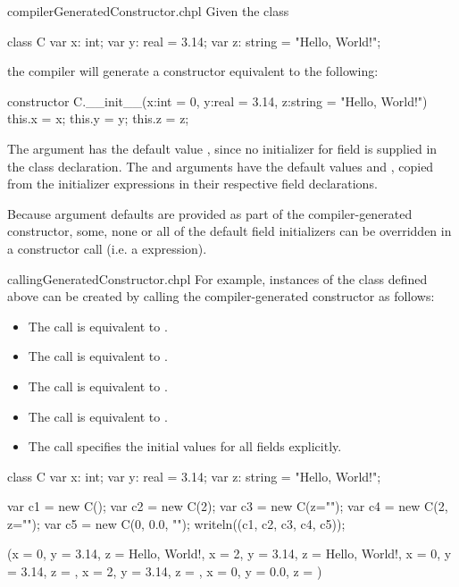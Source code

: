 \begin{chapelexample}{compilerGeneratedConstructor.chpl}
Given the class
\begin{chapel}
class C {
  var x: int;
  var y: real = 3.14;
  var z: string = "Hello, World!";
}
\end{chapel}
the compiler will generate a constructor equivalent to the following:
\begin{chapel}
constructor C.__init__(x:int = 0, y:real = 3.14, z:string = "Hello, World!")
{ this.x = x; this.y = y; this.z = z; }
{}
\end{chapel}
The  argument has the default value , since no initializer for
field  is supplied in the class declaration. The  and 
arguments have the default values  and ,
copied from the initializer expressions in their respective field declarations.
\end{chapelexample}

Because argument defaults are provided as part of the compiler-generated
constructor, some, none or all of the default field initializers can be
overridden in a constructor call (i.e. a  expression).

\begin{chapelexample}{callingGeneratedConstructor.chpl}
For example, instances of the class  defined above can be created by calling the compiler-generated constructor as follows:
\begin{itemize}
\item The call  is equivalent to .
\item The call  is equivalent to .
\item The call  is equivalent to .
\item The call  is equivalent to .
\item The call  specifies the initial values for all fields explicitly.
\end{itemize}
\begin{chapelpre}
class C {
  var x: int;
  var y: real = 3.14;
  var z: string = "Hello, World!";
}
\end{chapelpre}
\begin{chapelpost}
var c1 = new C();
var c2 = new C(2);
var c3 = new C(z="");
var c4 = new C(2, z="");
var c5 = new C(0, 0.0, "");
writeln((c1, c2, c3, c4, c5));
\end{chapelpost}
\begin{chapeloutput}
({x = 0, y = 3.14, z = Hello, World!}, {x = 2, y = 3.14, z = Hello, World!}, {x = 0, y = 3.14, z = }, {x = 2, y = 3.14, z = }, {x = 0, y = 0.0, z = })
\end{chapeloutput}
\end{chapelexample}

